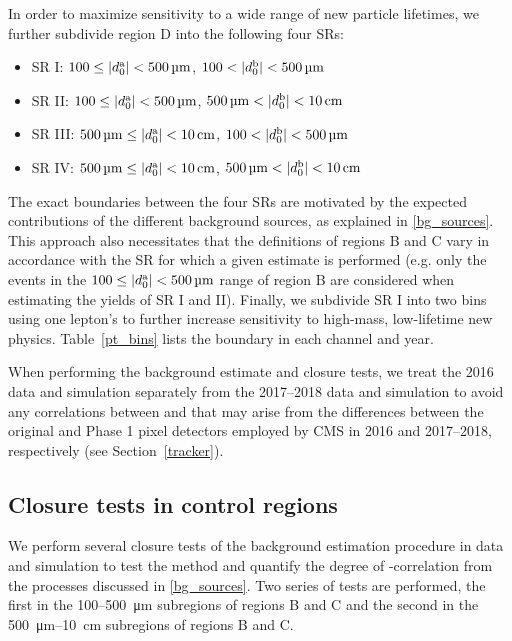 In order to maximize sensitivity to a wide range of new particle lifetimes, we further subdivide region D into the following four SRs:
\begin{itemize}
    \itemsep0em
    \item SR I:   $\num{100}\leq\ada<\SI{500}{\um}$, $\num{100} < \adb<\SI{500}{\um}$
    \item SR II:  $\num{100}\leq\ada<\SI{500}{\um}$, $\SI{500}{\um}<\adb<\SI{10}{\cm}$
    \item SR III: $\SI{500}{\um} \leq \ada<\SI{10}{\cm}$, $\num{100} < \adb<\SI{500}{\um}$
    \item SR IV:  $\SI{500}{\um} \leq \ada<\SI{10}{\cm}$, $\SI{500}{\um}<\adb<\SI{10}{\cm}$
\end{itemize}
The exact boundaries between the four SRs are motivated by the expected contributions of the different background sources, as explained in \ref{bg_sources}. This approach also necessitates that the definitions of regions B and C vary in accordance with the SR for which a given estimate is performed (e.g. only the events in the $\num{100}\leq\ada<\SI{500}{\um}$ range of region B are considered when estimating the yields of SR I and II). Finally, we subdivide SR I into two bins using one lepton's \pt to further increase sensitivity to high-mass, low-lifetime new physics. Table~\ref{pt_bins} lists the \pt boundary in each channel and year.



When performing the background estimate and closure tests, we treat the 2016 data and simulation separately from the 2017--2018 data and simulation to avoid any correlations between \ada and \adb that may arise from the differences between the original and Phase 1 pixel detectors employed by CMS in 2016 and 2017--2018, respectively (see Section~\ref{tracker}).

\subsection{Closure tests in control regions}
\label{cr_closure_tests}
We perform several closure tests of the background estimation procedure in data and simulation to test the method and quantify the degree of \ada-\adb correlation from the processes discussed in \ref{bg_sources}. Two series of tests are performed, the first in the \num{100}--\SI{500}{\um} subregions of regions B and C and the second in the \SI{500}{\um}--\SI{10}{\cm} subregions of regions B and C.

